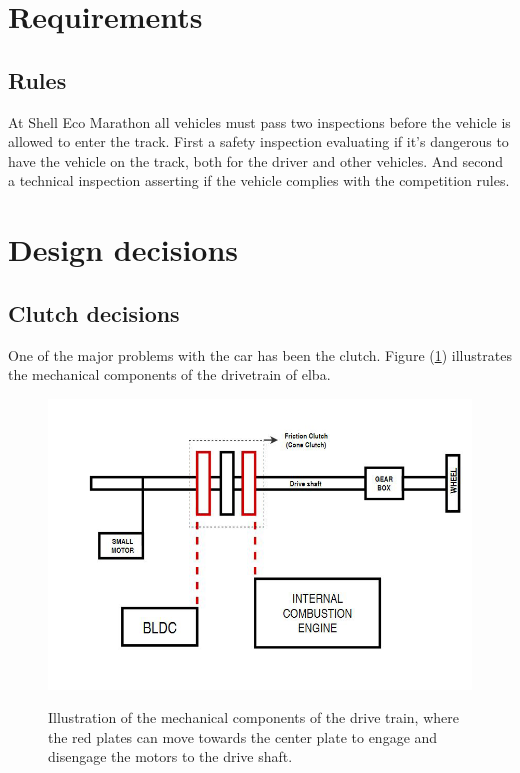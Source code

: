 \section{Requirements}
\subsection{Rules}
At Shell Eco Marathon all vehicles must pass two inspections before the vehicle is allowed to enter the track. First a safety inspection evaluating if it's dangerous to have the vehicle on the track, both for the driver and other vehicles. And second a technical inspection asserting if the vehicle complies with the competition rules.

\section{Design decisions}
\subsection{Clutch decisions}

One of the major problems with the car has been the clutch. Figure (\ref{fig:Drivetrain}) illustrates the mechanical components of the drivetrain of elba.

\begin{figure}[H]
    \centering\label{fig:Drivetrain}
    \includegraphics[width=1\textwidth]{./img/Drivetrain}
    \caption{Illustration of the mechanical components of the drive train, where the red plates can move towards the center plate to engage and disengage the motors to the drive shaft.}
\end{figure}

